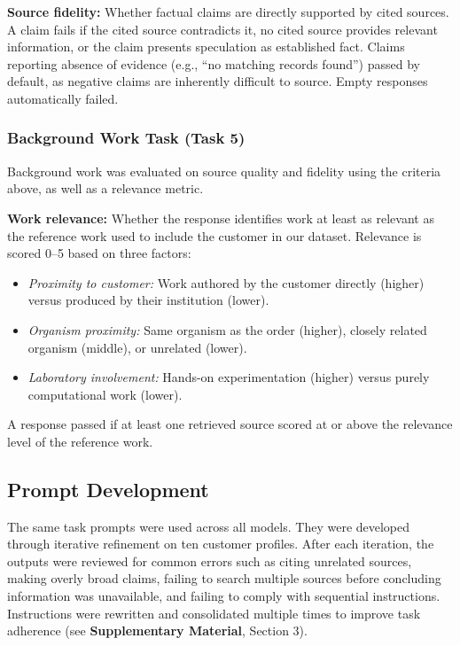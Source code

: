 \documentclass[12pt]{article}
\begin{document}
\textbf{Source fidelity:} Whether factual claims are directly supported by cited sources. A claim fails if the cited source contradicts it, no cited source provides relevant information, or the claim presents speculation as established fact. Claims reporting absence of evidence (e.g., ``no matching records found'') passed by default, as negative claims are inherently difficult to source. Empty responses automatically failed.

\subsubsection{Background Work Task (Task 5)}

Background work was evaluated on source quality and fidelity using the criteria above, as well as a relevance metric.

\textbf{Work relevance:} Whether the response identifies work at least as relevant as the reference work used to include the customer in our dataset. Relevance is scored 0--5 based on three factors:

\begin{itemize}
\item \textit{Proximity to customer:} Work authored by the customer directly (higher) versus produced by their institution (lower).
\item \textit{Organism proximity:} Same organism as the order (higher), closely related organism (middle), or unrelated (lower).
\item \textit{Laboratory involvement:} Hands-on experimentation (higher) versus purely computational work (lower).
\end{itemize}

A response passed if at least one retrieved source scored at or above the relevance level of the reference work.

\subsection{Prompt Development}

The same task prompts were used across all models. They were developed through iterative refinement on ten customer profiles. After each iteration, the outputs were reviewed for common errors such as citing unrelated sources, making overly broad claims, failing to search multiple sources before concluding information was unavailable, and failing to comply with sequential instructions. Instructions were rewritten and consolidated multiple times to improve task adherence (see \textbf{Supplementary Material}, Section 3).
\end{document}
